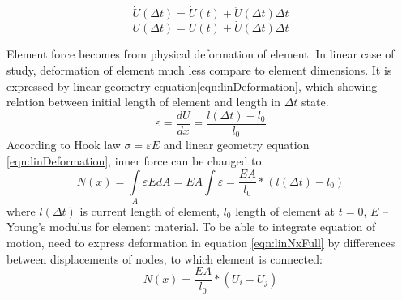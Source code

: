 \begin{equation}\label{eqn:Velos}
  \dot{U}(\Delta t)=\dot{U}(t)+\ddot{U}(\Delta t)\Delta t
\end{equation}
\begin{equation}\label{eqn:Displ}
  U(\Delta t)=U(t)+\dot{U}(\Delta t)\Delta t
\end{equation}
\par Element force becomes from physical deformation of
element. In linear case of study, deformation of element much less compare to
element dimensions. It is expressed by linear geometry
equation\eqref{eqn:linDeformation}, which showing relation between initial
length of element and length in $\Delta t$ state.
\begin{equation}\label{eqn:linDeformation}
  \varepsilon=\frac{dU}{dx}=\frac{l(\Delta t)-l_0}{l_0}
\end{equation}
According to Hook law $\sigma=\varepsilon E$ and linear geometry equation
\eqref{eqn:linDeformation}, inner force can be changed to:
\begin{equation}\label{eqn:linNxFull}
  N(x)= \int\limits_A \varepsilon EdA=EA\int \varepsilon=\frac{EA}{l_0}*(l(\Delta t)-l_0)
\end{equation}
where $l(\Delta t)$ is current length of element, $l_0$ length of element at
$t=0$, $E$ – Young’s modulus for element material. To be able to integrate
equation of motion, need to express deformation in equation
\eqref{eqn:linNxFull} by differences between displacements of nodes, to which
element is connected:
\begin{equation}\label{eqn:linNxWdispl}
  N(x)=\frac{EA}{l_0}*(U_{i}-U_{j})
\end{equation}\par

